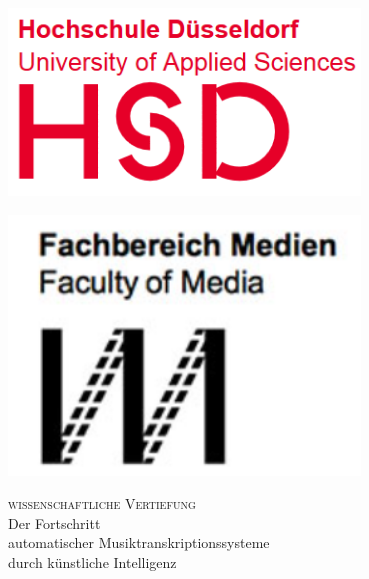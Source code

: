 \begin{titlepage}
    \thispagestyle{empty}

    \vspace*{1cm} %
    \begin{minipage}{0.45\textwidth}
        \raggedright
        \includegraphics[width=0.7\textwidth]{Graphics/HSDLogo} %
    \end{minipage}%
    \hfill
    \begin{minipage}{0.45\textwidth}
        \raggedleft
        \includegraphics[width=0.7\textwidth]{Graphics/FacultyOfMedia} %
    \end{minipage}

    \vspace{1.5cm} %

    \center

    \textsc{\Large wissenschaftliche Vertiefung}\\[2cm]

    \huge{Der Fortschritt}\\[0.2cm]
    \huge{automatischer Musiktranskriptionssysteme}\\[0.2cm]
    \huge{durch künstliche Intelligenz}\\[2cm]
    \Large


\end{titlepage}
